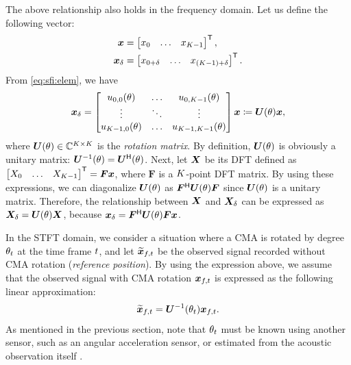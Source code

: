 \documentclass[sip,biber]{now-journal}
\begin{document}
The above relationship also holds in the frequency domain.
Let us define the following vector:
\begin{align}
  \bm{x} &= \begin{bmatrix} x _{0} & \dots & x _{K - 1} \end{bmatrix} ^{\mathsf{T}}, \\
  \bm{x} _{\delta} &= \begin{bmatrix} x _{0+\delta} & \dots & x _{(K - 1)+\delta} \end{bmatrix} ^{\mathsf{T}}.
\end{align}
From \eqref{eq:sfi:elem}, we have
\begin{equation}
  \bm{x} _{\delta}
  =
  \begin{bmatrix}
    u _{0, 0}(\theta) & \dots & u _{0, K - 1}(\theta) \\
    \vdots & \ddots & \vdots \\
    u _{K - 1, 0}(\theta) & \dots & u _{K - 1, K - 1}(\theta)
  \end{bmatrix}
  \bm{x}
  \coloneqq
  \bm{U} (\theta) \bm{x},
  \label{eq:rotmat}
\end{equation}
where $\bm{U} (\theta) \in \mathbb{C} ^{K\times K}$ is the \emph{rotation matrix}.
By definition, $\bm{U} (\theta)$ is obviously a unitary matrix: $\bm{U} ^{-1} (\theta) = \bm{U} ^{\mathsf{H}} (\theta)$.
Next, let $\bm{X}$ be its DFT defined as $\begin{bmatrix} X _{0} & \dots & X _{K - 1}\end{bmatrix} ^{\mathsf{T}} = \bm{F} \bm{x}$, where $\bm{F}$ is a $K$-point DFT matrix.
By using these expressions, we can diagonalize $\bm{U} (\theta)$ as $\bm{F}^{\mathsf{H}} \bm{U} (\theta) \bm{F}$ since $\bm{U} (\theta)$ is a unitary matrix.
Therefore, the relationship between $\bm{X}$ and $\bm{X} _{\delta}$ can be expressed as $\bm{X} _{\delta} = \bm{U} (\theta) \bm{X}$,
because $\bm{x} _{\delta} = \bm{F}^{\mathsf{H}} \bm{U} (\theta) \bm{F} \bm{x}$.

In the STFT domain, we consider a situation where a CMA is rotated by degree $\theta _{t}$ at the time frame $t$, and let $\refpos{\Obs} _{\ft}$ be the observed signal recorded without CMA rotation (\emph{reference position}).
By using the expression above, we assume that the observed signal with CMA rotation $\Obs _{\ft}$ is expressed as the following linear approximation:
\begin{equation}
  \refpos{\Obs} _{\ft} = \rotMat ^{-1} (\rotSpat _{\tframe}) \Obs _{\ft}.
\end{equation}
As mentioned in the previous section, note that $\theta _{t}$ must be known using another sensor, such as an angular acceleration sensor, or estimated from the acoustic observation itself \cite{Lian:2021:APSIPA}.
\end{document}
